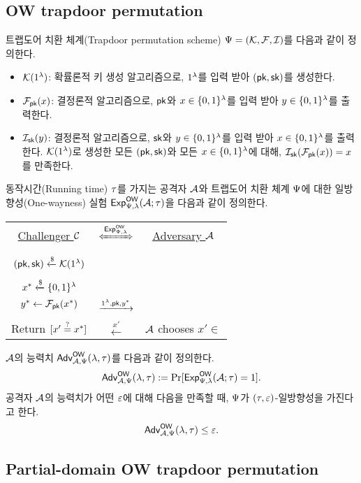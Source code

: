 \documentclass{article}
\theoremstyle{definition}
\begin{document}
\subsection{OW trapdoor permutation}
트랩도어 치환 체계(Trapdoor permutation scheme) $\tdsch = (\genkey, \td, \itd)$를 다음과
같이 정의한다.
\begin{itemize}
	\item $\genkey(1^{\sp})$: 확률론적 키 생성 알고리즘으로, $1^{\sp}$를 입력
	받아 $(\pk, \sk)$를 생성한다.
	\item $\td_{\pk}(x)$: 결정론적 알고리즘으로, $\pk$와 $x \in \set{0, 1}^{\sp}$를 입력 받아
	$y \in \set{0 ,1}^{\sp}$를 출력한다.
	\item $\itd_{\sk}(y)$: 결정론적 알고리즘으로, $\sk$와 $y \in \set{0,
	1}^{\sp}$를 입력 받아 $x \in \set{0, 1}^{\sp}$를 출력한다.
	$\genkey(1^{\sp})$로 생성한 모든 $(\pk, \sk)$와 모든 $x \in \set{0,
	1}^{\sp}$에 대해, $\itd_{\sk}(\td_{\pk}(x)) = x$를 만족한다.
\end{itemize}
동작시간(Running time) $\rt$를 가지는 공격자 $\adv$와 트랩도어 치환 체계
$\tdsch$에 대한 일방향성(One-wayness) 실험 $\Exp^{\ow}_{\tdsch, \sp}(\adv; \rt)$을
다음과 같이 정의한다.
\begin{tcolorbox}[colback=white]
	\centering
	\begin{tabularx}{\linewidth}{CcC}
		\underline{Challenger $\ch$} & $\xLeftrightarrow{\Exp^{\ow}_{\tdsch, \sp}}$ & \underline{Adversary $\adv$} \\
		\\
		$(\pk, \sk) \rgets \genkey(1^{\sp})$ & & \\
		\\
		$x^* \rgets \set{0, 1}^{\sp}$ \\ $y^* \gets \td_{\pk}(x^*)$ & $\xrightarrow{1^{\sp}, \pk, y^*}$ & \\
		\\ 
		Return $[x' \same x^*]$ & $\xleftarrow{x'}$ & $\adv$ chooses $x' \in \xspace$ \\
  \end{tabularx}
\end{tcolorbox}

$\adv$의 능력치 $\Adv^{\ow}_{\adv,
\tdsch}(\sp, \rt)$를 다음과 같이 정의한다.
$$
	\Adv^{\ow}_{\adv, \tdsch}(\sp, \rt) := \Pr[\Exp^{\ow}_{\tdsch, \sp}(\adv; \rt) = 1].
$$
공격자 $\adv$의 능력치가 어떤 $\negl$에 대해 다음을 만족할 때, $\tdsch$가 $(\rt,
\negl)$-일방향성을 가진다고 한다.
$$
	\Adv^{\ow}_{\adv, \tdsch}(\sp, \rt) \le \negl.
$$

\subsection{Partial-domain OW trapdoor permutation}
\end{document}
